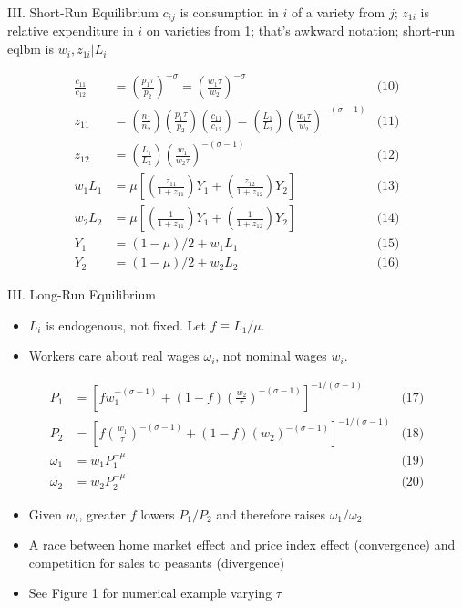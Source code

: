\documentclass[11pt,notes=hide,aspectratio=169]{beamer}
\begin{document}
\begin{frame}{III. Short-Run Equilibrium}
$c_{ij}$ is consumption in $i$ of a variety from $j$; 
$z_{1i}$ is relative expenditure in $i$ on varieties from 1;
that's awkward notation;
short-run eqlbm is $w_i,z_{1i}\vert L_i$
\begin{small}
\begin{align*}
\frac{c_{11}}{c_{12}} 
&= \left(\frac{p_1\tau}{p_2}\right)^{-\sigma} 
= \left(\frac{w_1\tau}{w_2}\right)^{-\sigma}
&
\text{(10)}
\\
z_{11} &= \left(\frac{n_1}{n_2}\right)  \left(\frac{p_1\tau}{p_2}\right) \left(\frac{c_{11}}{c_{12}}\right) 
= \left(\frac{L_1}{L_2}\right) \left(\frac{w_1\tau}{w_2}\right)^{-(\sigma-1)}
&
\text{(11)}
\\
z_{12} 
&=
\left(\frac{L_1}{L_2}\right) \left(\frac{w_1}{w_2\tau}\right)^{-(\sigma-1)}
&
\text{(12)}
\\
w_1 L_1 &= 
\mu \left[\left(\frac{z_{11}}{1+z_{11}}\right) Y_1 + \left(\frac{z_{12}}{1+z_{12}}\right) Y_2   \right]
&
\text{(13)}
\\
w_2 L_2 &= 
\mu \left[\left(\frac{1}{1+z_{11}}\right) Y_1 + \left(\frac{1}{1+z_{12}}\right) Y_2   \right]
&
\text{(14)}
\\
Y_1 &= (1-\mu)/2 + w_1 L_1
&
\text{(15)}
\\
Y_2 &= (1-\mu)/2 + w_2 L_2
&
\text{(16)}
\end{align*}
\end{small}
\end{frame}
\begin{frame}{III. Long-Run Equilibrium}
\begin{itemize}
\item $L_i$ is endogenous, not fixed. Let $f \equiv L_1/\mu$.
\item Workers care about real wages $\omega_i$, not nominal wages $w_i$.
\end{itemize}
\begin{align*}
P_1 &= \left[fw_1^{-(\sigma-1)} + (1-f) \left(\frac{w_2}{\tau}\right)^{-(\sigma-1)} \right]^{-1/(\sigma-1)}
&
\text{(17)}
\\
P_2 &= \left[f\left(\frac{w_1}{\tau}\right)^{-(\sigma-1)} + (1-f) \left(w_2\right)^{-(\sigma-1)} \right]^{-1/(\sigma-1)}
&
\text{(18)}
\\
\omega_1 &= w_1 P_1^{-\mu}
&
\text{(19)}
\\
\omega_2 &= w_2 P_2^{-\mu}
&
\text{(20)}
\end{align*}
\vspace{-6mm}
\begin{itemize}
	\item Given $w_i$, greater $f$ lowers $P_1/P_2$ and therefore raises $\omega_1/\omega_2$.
	\item A race between home market effect and price index effect (convergence) and competition for sales to peasants (divergence)
	\item See Figure 1 for numerical example varying $\tau$
\end{itemize}
\end{frame}
\end{document}
